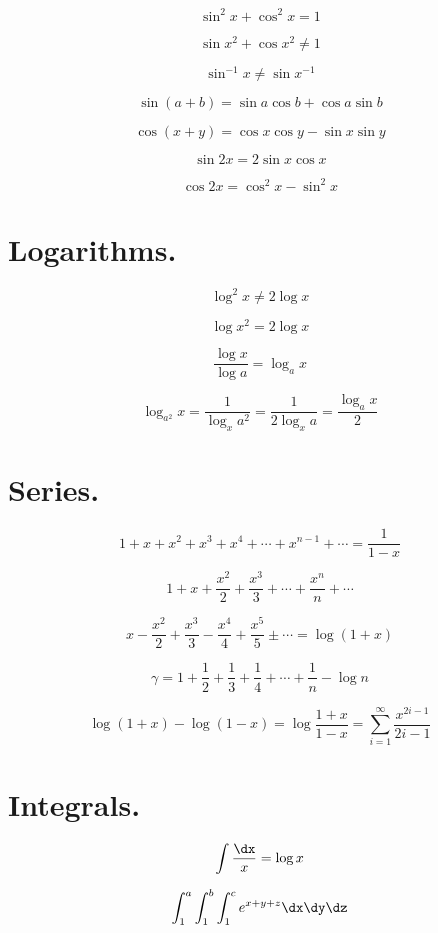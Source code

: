 $$\sin^2x+\cos^2x=1$$

$$\sin x^2 + \cos x^2 \neq 1 $$

$$\sin^{-1}x \neq \sin x^{-1}$$

$$\sin (a+b) = \sin a \cos b + \cos a \sin b$$

$$\cos (x+y)=\cos x \cos y - \sin x \sin y$$

$$\sin 2x = 2 \sin x \cos x $$

$$\cos 2x = \cos^2 x -\sin^2 x$$



\section{Logarithms. }

$$\log^2x\neq2\log x$$

$$\log x^2=2\log x$$

$$\frac{\log x}{\log a} = \log_a x$$

$$\log_{a^2} x = \frac{1}{\log_x a^2}= \frac{1}{2\log_x a} =
\frac{\log_a x}{2}$$



\section{Series. }

$$1+x+x^2+x^3+x^4+\cdots+x^{n-1}+\cdots  = \frac{1}{1-x}$$

$$1+x+\frac{x^2}{2}+\frac{x^3}{3}+\cdots +\frac{x^n}{n}+\cdots$$

$$  x - \frac{x^2}{2} +\frac{x^3}{3}
-\frac{x^4}{4}+\frac{x^5}{5} \pm \cdots  = \log(1+x)$$

$$\gamma = 1+\frac{1}{2}+\frac{1}{3} +\frac{1}{4} +\cdots +\frac{1}{n}
-\log n $$

$$\log (1+x) - \log (1-x) = \log \frac{1+x}{1-x} = \sum_{i=1}^\infty
\frac{x^{2i-1}}{2i -1}$$


\section{Integrals. }


$$\int\frac{\dx}{x} =\log x$$

$$\int_1^a \int_1^b\int_1^c e^{x+y+z}\dx\dy\dz$$

